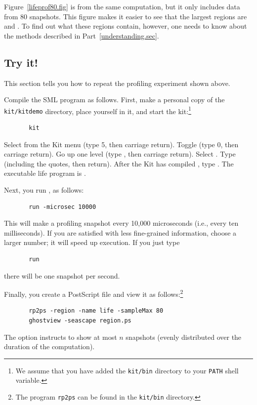 \documentclass[12pt]{book}
\begin{document}
Figure~\ref{lifeprof80.fig} is from the same computation, but it only includes
data from 80 snapshots. This figure makes it easier to see that the largest
regions are  and . To find out what these regions contain,
however, one needs to know about the methods described in Part~\ref{understanding.sec}.

\subsection{Try it!}
This section tells you how to repeat the profiling experiment shown above. 

Compile the SML program  as follows. First,
make a personal copy of the {\tt kit/kitdemo} directory, place
yourself in it, and start the kit:\footnote{We assume that you have added
  the {\tt kit/bin} directory to your {\tt PATH} shell variable.}
\begin{verbatim}
       kit
\end{verbatim}
Select  from the Kit menu (type 5, then carriage return).
Toggle  (type 0, then carriage return). Go up one
level (type , then carriage return). Select .
Type  (including the quotes, then return). After the Kit has compiled
, type . The executable life program
is .

Next, you run , as follows:
\begin{verbatim}
       run -microsec 10000
\end{verbatim}
This will make a profiling snapshot every 10,000 microseconds (i.e., every 
ten milliseconds). If you are satisfied with less fine-grained information,
choose a larger number; it will speed up execution. If you just type
\begin{verbatim}
       run 
\end{verbatim}
there will be one snapshot per second.

Finally, you create a PostScript file and view it as
follows:\footnote{The program {\tt rp2ps} can
  be found in the {\tt kit/bin} directory.}
\begin{verbatim}
       rp2ps -region -name life -sampleMax 80 
       ghostview -seascape region.ps
\end{verbatim}
The option  instructs  
to show at most $n$ snapshots (evenly distributed
over the duration of the computation).
\end{document}
